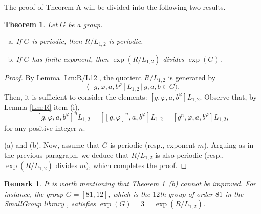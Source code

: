 \documentclass[12pt,leqno]{amsart}
\newtheorem{thm}[theorem]{\sc Theorem}
\newtheorem{remar}[theorem]{\sc Remark}
\begin{document}
The proof of Theorem A will be divided into the following two results.

\begin{thm} \label{thm:quot}
Let $G$ be a group. 
\begin{enumerate} [(a)] 
    \item If $G$ is periodic, then $R/L_{1,2}$ is periodic. 
    \item If $G$ has finite exponent, then $ \exp\left( R/L_{1,2}\right)$ divides $\exp(G)$. 
\end{enumerate} 
\end{thm}

\begin{proof}
By Lemma \ref{Lm:R/L12}, the quotient $R/L_{1,2}$ is generated by 
\[\big\langle { [g,\varphi, a,b^{\varphi}]} L_{1,2} \, | \, g,a,b\in G\big\rangle.
\]
Then, it is sufficient to consider the elements:  $[g,\varphi, a,b^{\varphi}]L_{1,2}$. Observe that, by Lemma \ref{Lm:R} item (i), 
    \[
[g,\varphi,a,b^{\varphi}]^nL_{1,2}=[[g,\varphi]^n,a,b^{\varphi}]L_{1,2}= [g^n,\varphi,a,b^{\varphi}]L_{1,2},
    \]
for any positive integer $n$. 

(a) and (b). Now, assume that $G$ is periodic (resp., exponent $m$). Arguing as in the previous paragraph, we deduce that $R/L_{1,2}$ is also periodic (resp., $\exp(R/L_{1,2})$ divides $m$), which completes the proof.
\end{proof}

\begin{remar}
It is worth mentioning that Theorem \ref{thm:quot}~(b) cannot be improved. For instance, the group $G = [81, 12]$, which is the $12$th group of order $81$ in the SmallGroup library \cite{GAP4}, satisfies $\exp(G)=3 = \exp(R/L_{1,2})$.    
\end{remar}
\end{document}
